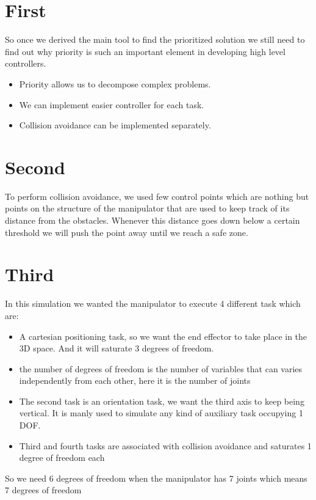 \documentclass[12pt, a4paper]{article}
\begin{document}
\section{First}
So once we derived the main tool to find the prioritized solution we still need to find out why priority is such an important element in developing high level controllers.

\begin{itemize}
\item Priority allows us to decompose complex problems.
\item We can implement easier controller for each task.
\item Collision avoidance can be implemented separately.
\end{itemize}

\section{Second}

To perform collision avoidance, we used few control points which are nothing but points on the structure of the manipulator that are used to keep track of its distance from the obstacles. Whenever this distance goes down below a certain threshold we will push the point away until we reach a safe zone.

\section{Third}

In this simulation we wanted the manipulator to execute 4 different task which are:
\begin{itemize}
\item A cartesian positioning task, so we want the end effector to take place in the 3D space. And it will saturate 3 degrees of freedom.
\item the number of degrees of freedom is the number of variables that can varies independently from each other, here it is the number of joints
\item The second task is an orientation task, we want the third axis to keep being vertical. It is manly used to simulate any kind of auxiliary task occupying 1 DOF.
\item Third and fourth tasks are associated with collision avoidance and saturates 1 degree of freedom each
\end{itemize}

So we need 6 degrees of freedom when the manipulator has 7 joints which means 7 degrees of freedom
\end{document}
